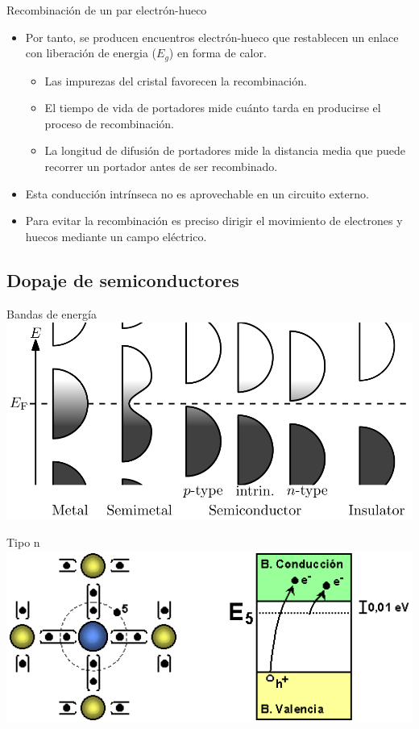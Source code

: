 \documentclass[xcolor={usenames,svgnames,dvipsnames}]{beamer}
\begin{document}
\begin{frame}[label=sec-1-2-2]{Recombinación de un par electrón-hueco}
\begin{itemize}
\item Por tanto, se producen \alert{encuentros electrón-hueco} que restablecen un enlace con liberación de energia ($E_{g}$) en forma de calor.

\begin{itemize}
\item Las impurezas del cristal favorecen la recombinación.

\item El tiempo de vida de portadores mide cuánto tarda en producirse el proceso de recombinación.

\item La longitud de difusión de portadores mide la distancia media que puede recorrer un portador antes de ser recombinado.
\end{itemize}

\item Esta \alert{conducción intrínseca} \alert{no es aprovechable} en un circuito externo.

\item Para evitar la recombinación \alert{es preciso dirigir el movimiento} de electrones y huecos mediante un campo eléctrico.
\end{itemize}
\end{frame}

\subsection{Dopaje de semiconductores}
\label{sec-1-3}
\begin{frame}[label=sec-1-3-1]{Bandas de energía}
\includegraphics[width=.9\linewidth]{../figs/Band_filling_diagram.png}
\end{frame}


\begin{frame}[label=sec-1-3-2]{Tipo n}
\includegraphics[width=.9\linewidth]{../figs/Semiconductor_tipo_n.png}
\end{frame}
\end{document}
